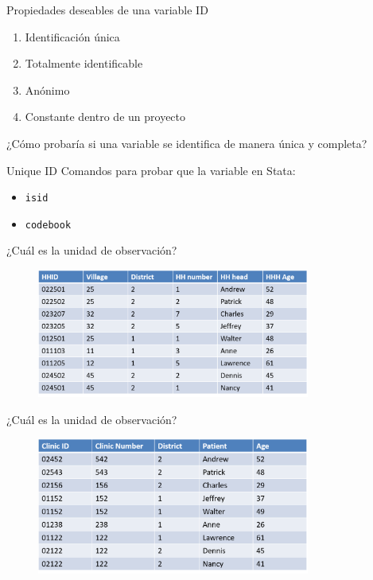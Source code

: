 \documentclass[10pt, aspectratio=169, compress]{beamer}
\begin{document}
\begin{frame}[t]{Propiedades deseables de una variable ID}
	\begin{enumerate}
		\item Identificación única
		\item Totalmente identificable
		\item Anónimo
		\item Constante dentro de un proyecto
	\end{enumerate}
	¿Cómo probaría si una variable se identifica de manera única y completa?
\end{frame}
\begin{frame}[t]{Unique ID}
	Comandos para probar que la variable en Stata:
	\begin{itemize}
		\item \texttt{isid}
		\item \texttt{codebook}
	\end{itemize}
\end{frame}
\begin{frame}{¿Cuál es la unidad de observación?}
	\begin{figure}[H]
		\centering
		\includegraphics[width=0.8\textwidth]{hh_data.png}
	\end{figure}	
\end{frame}
\begin{frame}{¿Cuál es la unidad de observación?}
	\begin{figure}[H]
		\centering
		\includegraphics[width=0.8\textwidth]{clinic_data.png}
	\end{figure}	
\end{frame}
\end{document}
